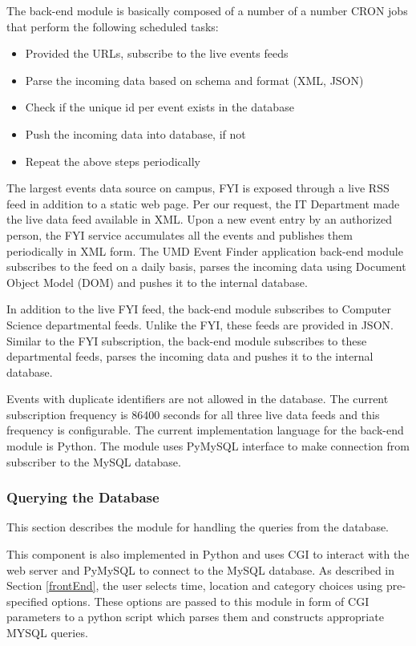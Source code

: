 \documentclass{acm_proc_article-sp}
\begin{document}
The back-end module is basically composed of a number of a number CRON jobs that perform the following scheduled tasks:

\begin{itemize}
\item Provided the URLs, subscribe to the live events feeds 
\item Parse the incoming data based on schema and format (XML, JSON)
\item Check if the unique id per event exists in the database
\item Push the incoming data into database, if not
\item Repeat the above steps periodically
\end{itemize}

The largest events data source on campus, FYI is exposed through a live RSS feed in addition to a static web page. Per our request, the IT Department made the live data feed available in XML. Upon a new event entry by an authorized person, the FYI service accumulates all the events and publishes them periodically in XML form. The UMD Event Finder application back-end module subscribes to the feed on a daily basis, parses the incoming data using Document Object Model (DOM) and pushes it to the internal database. 

In addition to the live FYI feed, the back-end module subscribes to Computer Science departmental feeds. Unlike the FYI, these feeds are provided in JSON. Similar to the FYI subscription, the back-end module subscribes to these departmental feeds, parses the incoming data and pushes it to the internal database.

Events with duplicate identifiers are not allowed in the database. The current subscription frequency is 86400 seconds for all three live data feeds and this frequency is configurable. The current implementation language for the back-end module is Python. The module uses PyMySQL interface to make connection from subscriber to the MySQL database.

\subsubsection{Querying the Database}
This section describes the module for handling the queries from the database. 

This component is also implemented in Python and uses CGI to interact with the web server and PyMySQL to connect to the MySQL database. As described in Section \ref{frontEnd}, the user selects time, location and category choices using pre-specified options. These options are passed to this module in form of CGI parameters to a python script which parses them and constructs appropriate MYSQL queries. 
\end{document}
